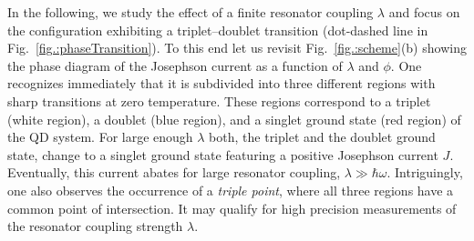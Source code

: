 \documentclass[aps,prb,twocolumn,superscriptaddress,amsmath,amssymb,longbibliography]{revtex4-1}
\begin{document}
	In the following, we study the effect of a finite resonator coupling $\lambda$ and focus on the configuration exhibiting 
	a triplet--doublet transition (dot-dashed line in Fig.~\ref{fig.:phaseTransition}). To this end let us revisit 
	Fig.~\ref{fig.:scheme}(b) showing the phase diagram of the Josephson current as a function of $\lambda$ and $\phi$. 
	One recognizes immediately that it is subdivided into three different regions with sharp transitions at zero temperature.
	These regions correspond to a triplet (white region), a doublet (blue region), and a singlet ground state (red region) of the
	QD system. For large enough $\lambda$ both, the triplet and the doublet ground state, change to a singlet ground state
	featuring a positive Josephson current $J$. Eventually, this current abates for large resonator coupling, $\lambda\gg\hbar\omega$. 
	Intriguingly, one also observes the occurrence of a \textit{triple point}, where all three regions have a common point of intersection.
	It may qualify for high precision measurements of the resonator coupling strength $\lambda$.
	
\end{document}
